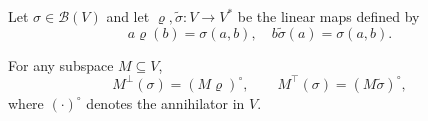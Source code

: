Let $\sigma \in \mathcal{B}(V)$ and let $\varrho, \tilde{\sigma}: V \to V^*$ be the linear maps defined by
$$a\varrho(b) = \sigma(a, b), \quad b\tilde{\sigma}(a) = \sigma(a, b).$$

For any subspace $M \subseteq V$,
$$M^{\perp}(\sigma) = (M\varrho)^{\circ}, \qquad M^{\top}(\sigma) = (M\tilde{\sigma})^{\circ},$$
where $(\cdot)^{\circ}$ denotes the annihilator in $V$.

